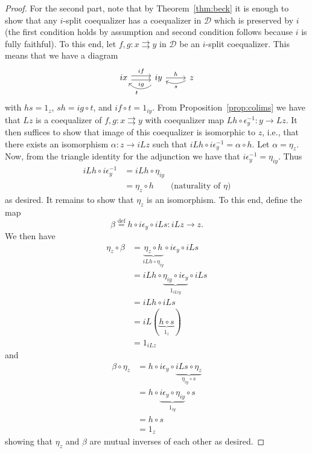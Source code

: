 \begin{proof}
  For the second part, note that by Theorem~\ref{thm:beck} it is enough to show that any $ i $-split coequalizer has a coequalizer in $ \mathcal{D} $ which is preserved by $ i $ (the first condition holds by assumption and second condition follows because $ i $ is fully faithful). To this end, let $ f,g:x\rightrightarrows y $ in $ \mathcal{D} $ be an $ i $-split coequalizer. This means that we have a diagram
  \[\begin{tikzcd}
	  ix & iy & z
	  \arrow["h", from=1-2, to=1-3]
	  \arrow["s", bend left=25, from=1-3, to=1-2]
	  \arrow["if", shift left, from=1-1, to=1-2]
	  \arrow["ig"', shift right, from=1-1, to=1-2]
	  \arrow["t", bend left=45, from=1-2, to=1-1]
  \end{tikzcd}\]
  with $ hs = 1_z $, $ sh = ig \circ t $, and $ if \circ t = 1_{iy} $. From Proposition~\ref{prop:colims} we have that $ Lz $ is a coequalizer of $ f,g:x \rightrightarrows y $ with coequalizer map $ Lh \circ \epsilon_y^{-1}: y \to Lz $. It then suffices to show that image of this coequalizer is isomorphic to $ z $, i.e., that there exists an isomorphism $ \alpha: z \to iL z $ such that $ iLh \circ i\epsilon_y^{-1} = \alpha \circ h $. Let $ \alpha = \eta_z $. Now, from the triangle identity for the adjunction we have that $ i\epsilon_y^{-1} = \eta_{iy} $. Thus
  \begin{align*}
    iLh \circ i\epsilon_y^{-1} &= iLh \circ \eta_{iy} \\
                               &= \eta_z \circ h\quad\quad\text{(naturality of } \eta)
  \end{align*}
  as desired. It remains to show that $ \eta_z $ is an isomorphism. To this end, define the map
  \begin{equation}
    \beta \stackrel{\text{def}}{=} h\circ i\epsilon_y \circ iLs: iLz \to z.
  \end{equation}
  We then have
  \begin{align*}
    \eta_z \circ \beta &= \underbrace{\eta_z \circ h}_{iLh \circ \eta_{iy}} \circ i\epsilon_y \circ iLs \\
                       &= iLh \circ \underbrace{\eta_{iy} \circ i\epsilon_y}_{1_{iLiy}} \circ iLs \\
                       &= iLh \circ iLs \\
                       &= iL(\underbrace{h \circ s}_{1_z}) \\
                       &= 1_{iLz}
  \end{align*}
  and
  \begin{align*}
    \beta \circ \eta_z &= h \circ i\epsilon_y \circ \underbrace{iLs \circ \eta_z}_{\eta_{iy} \circ s} \\
                       &= h \circ \underbrace{i\epsilon_y \circ \eta_{iy}}_{1_{iy}} \circ s \\
                       &= h \circ s \\
                       &= 1_z
  \end{align*}
  showing that $ \eta_z $ and $ \beta $ are mutual inverses of each other as desired.
\end{proof}

